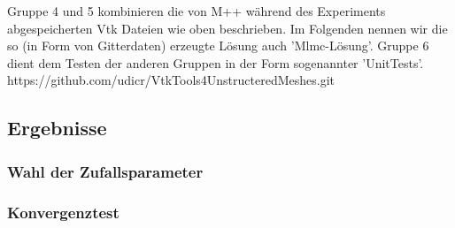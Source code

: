 Gruppe 4 und 5 kombinieren die von M++ während des Experiments abgespeicherten Vtk Dateien wie oben beschrieben. Im Folgenden nennen wir die so (in Form von Gitterdaten) erzeugte Lösung auch 'Mlmc-Lösung'.
Gruppe 6 dient dem Testen der anderen Gruppen in der Form sogenannter 'UnitTests'.
https://github.com/udicr/VtkTools4UnstructeredMeshes.git

\subsection{Ergebnisse}
\subsubsection{Wahl der Zufallsparameter}
\subsubsection{Konvergenztest}
